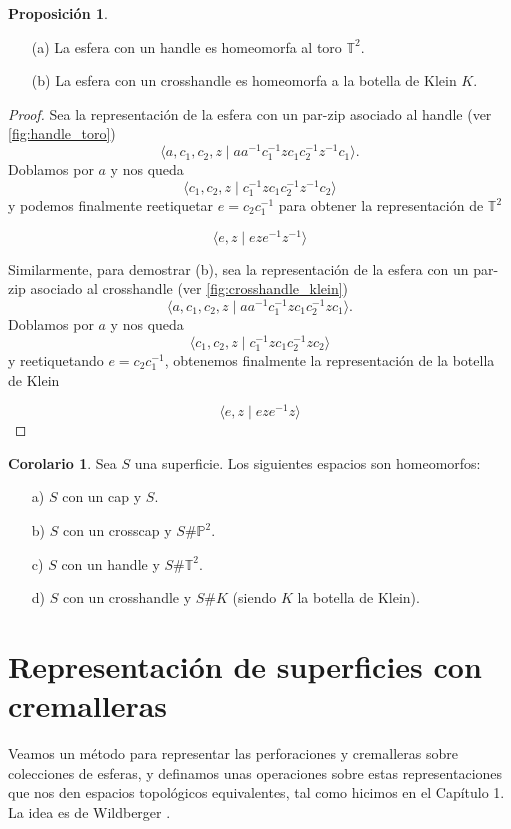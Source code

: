 \documentclass[10pt]{report}
\newcommand{\Toro}{\mathbb{T}^2}
\newcommand{\Proyectivo}{\mathbb{P}^2}
\theoremstyle{definition}
\newtheorem{corol}[defin]{Corolario}
\newtheorem{prop}[defin]{Proposición}
\begin{document}
\begin{prop}
\begin{itemize}

\item[(a)] La esfera con un handle es homeomorfa al toro $\Toro$.
\item [(b)] La esfera con un crosshandle es homeomorfa a la botella de Klein $K$.

\end{itemize}
\end{prop}
\begin{proof}
Sea la representación de la esfera con un par-zip asociado al handle (ver \autoref{fig:handle_toro}) $$\langle a,c_1,c_2,z\mid aa^{-1} c_1^{-1}zc_1c_2^{-1}z^{-1}c_1\rangle.$$ Doblamos por $a$ y nos queda
\[
\langle c_1,c_2,z\mid c_1^{-1}zc_1c_2^{-1}z^{-1}c_2\rangle
\]
y podemos finalmente reetiquetar $e=c_2c_1^{-1}$ para obtener la representación de $\Toro$ 

\[
\langle e,z\mid eze^{-1}z^{-1}\rangle
\]

Similarmente, para demostrar (b), sea la representación de la esfera con un par-zip asociado al crosshandle (ver \autoref{fig:crosshandle_klein}) $$\langle a,c_1,c_2,z\mid aa^{-1} c_1^{-1}zc_1c_2^{-1}zc_1\rangle.$$ Doblamos por $a$ y nos queda
\[
\langle c_1,c_2,z\mid c_1^{-1}zc_1c_2^{-1}zc_2\rangle
\]
y reetiquetando $e=c_2c_1^{-1}$, obtenemos finalmente la representación de la botella de Klein

\[
\langle e,z\mid eze^{-1}z\rangle
\]


\end{proof}



\begin{corol}
Sea $S$ una superficie. Los siguientes espacios son homeomorfos:
\begin{itemize}
\item[a)] $S$ con un cap y $S$.
\item[b)] $S$ con un crosscap y $S\# \Proyectivo$.
\item[c)] $S$ con un handle y $S\# \Toro$.
\item[d)] $S$ con un crosshandle y $S\# K$ (siendo $K$ la botella de Klein). 
\end{itemize}
\end{corol}




\section{Representación de superficies con cremalleras}
Veamos un método para representar las perforaciones y cremalleras sobre colecciones de esferas, y definamos unas operaciones sobre estas representaciones que nos den espacios topológicos equivalentes, tal como hicimos en el Capítulo 1. La idea es de Wildberger \cite{wildberger}.
\end{document}
